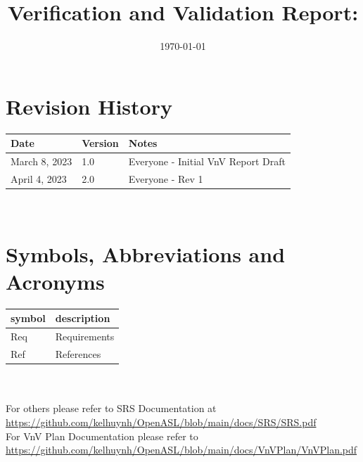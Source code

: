 \documentclass[12pt, titlepage]{article}
\begin{document}
\title{Verification and Validation Report: \progname} 
\author{\authname}
\date{\today}
	
\maketitle


\section{Revision History}

\begin{tabularx}{\textwidth}{p{3cm}p{2cm}X}
\toprule {\bf Date} & {\bf Version} & {\bf Notes}\\
\midrule
March 8, 2023 & 1.0 & Everyone - Initial VnV Report Draft\\
April 4, 2023 & 2.0 & Everyone - Rev 1
\bottomrule
\end{tabularx}

~\newpage

\section{Symbols, Abbreviations and Acronyms}

\renewcommand{\arraystretch}{1.2}
\begin{tabular}{l l} 
  \toprule		
  \textbf{symbol} & \textbf{description}\\
  \midrule 
  Req & Requirements\\
  Ref & References \\
  \bottomrule
\end{tabular}\\
~\\
For others please refer to SRS Documentation at \url{https://github.com/kelhuynh/OpenASL/blob/main/docs/SRS/SRS.pdf}\\
For VnV Plan Documentation please refer to \url{https://github.com/kelhuynh/OpenASL/blob/main/docs/VnVPlan/VnVPlan.pdf}
\end{document}
